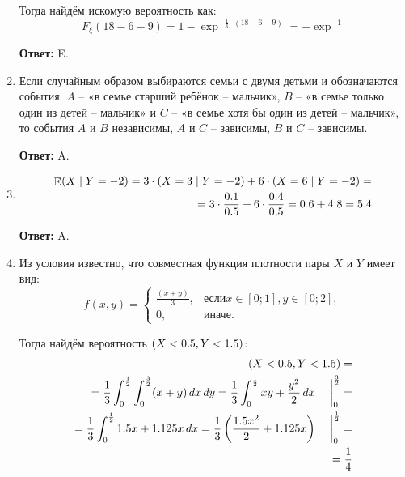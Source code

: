 \documentclass[a4paper]{article} %
\DeclareMathOperator{\E}{\mathbb{E}}
\let\P\relax
\DeclareMathOperator{\P}{\mathbb{P}}
\begin{document}
\begin{enumerate}
    Тогда найдём искомую вероятность как:
    \[
    F_{\xi}(18 - 6 - 9) = 1 - \exp^{-\frac{1}{3} \cdot (18 - 6 - 9)} = -\exp^{-1}
    \]
    
    \textbf{Ответ:} E.
    
    
    \item
    Если случайным образом выбираются семьи с двумя детьми и обозначаются события: $A$ -- «в семье старший ребёнок -- мальчик», $B$ -- «в семье только один из детей -- мальчик» и $C$ -- «в семье хотя бы один из детей -- мальчик», то события $A$ и $B$ независимы, $A$ и $C$ -- зависимы, $B$ и $C$ -- зависимы.
    
    \textbf{Ответ:} A.
    
    
    \item
    \begin{align*}
    \E(X \mid Y = -2) = 3 \cdot \P(X = 3 \mid Y = -2) + 6 \cdot \P(X = 6 \mid Y = -2) = \\
    = 3 \cdot \frac{0.1}{0.5} + 6 \cdot \frac{0.4}{0.5} = 0.6 + 4.8 = 5.4
    \end{align*}
    
    \textbf{Ответ:} A.
    
    
    \item
    Из условия известно, что совместная функция плотности пары $X$ и $Y$ имеет вид:
    \[
    f(x, y) = 
    \begin{cases}
    \frac{(x + y)}{3}, & \text{если} x \in [0; 1], y \in [0; 2], \\
    0, & \text{иначе}.
    \end{cases}
    \]
    
    Тогда найдём вероятность $\P(X < 0.5, Y < 1.5)$:
    \begin{align*}
    \P(X < 0.5, Y < 1.5) = \\ 
    = \frac{1}{3} \int_{0}^{\frac{1}{2}}\int_{0}^{\frac{3}{2}} (x + y) \,dx\,dy = \frac{1}{3} \int_{0}^{\frac{1}{2}} xy + \frac{y^{2}}{2} \,dx \left.\begin{matrix} & \\ & \end{matrix}\right|_{0}^{\frac{3}{2}} = \\
    = \frac{1}{3} \int_{0}^{\frac{1}{2}} 1.5x + 1.125x \,dx = \frac{1}{3}\left(\frac{1.5x^{2}}{2} + 1.125x \right) \left.\begin{matrix} & \\ & \end{matrix}\right|_{0}^{\frac{1}{2}} = \\
    = \frac{1}{4}
    \end{align*}
    

\end{enumerate}
\end{document}
